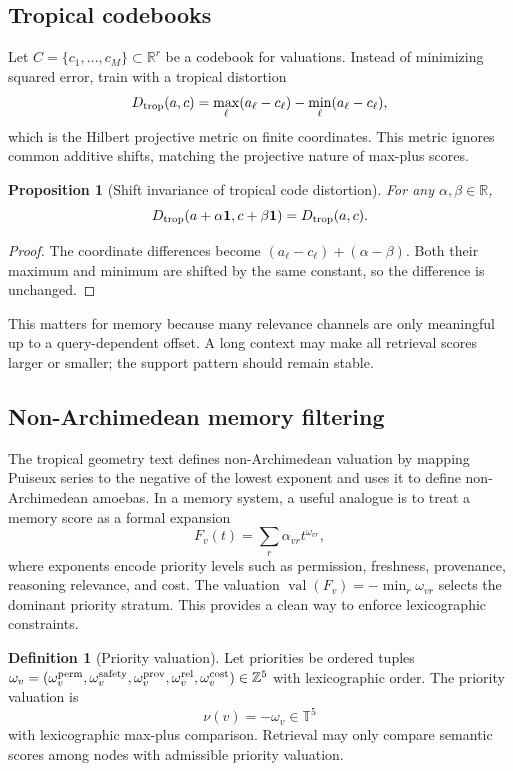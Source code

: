 \documentclass[11pt]{article}
\newtheorem{proposition}[theorem]{Proposition}
\theoremstyle{definition}
\newtheorem{definition}[theorem]{Definition}
\theoremstyle{remark}
\newcommand{\T}{\mathbb{T}}
\newcommand{\R}{\mathbb{R}}
\newcommand{\Z}{\mathbb{Z}}
\newcommand{\val}{\operatorname{val}}
\newcommand{\one}{\mathbf{1}}
\begin{document}
\subsection{Tropical codebooks}

Let \(C=\{c_1,\ldots,c_M\}\subset\R^r\) be a codebook for valuations. Instead of minimizing squared error, train with a tropical distortion
\[
    D_{\rm trop}(a,c)=\max_\ell(a_\ell-c_\ell)-\min_\ell(a_\ell-c_\ell),
\]
which is the Hilbert projective metric on finite coordinates. This metric ignores common additive shifts, matching the projective nature of max-plus scores.

\begin{proposition}[Shift invariance of tropical code distortion]
For any \(\alpha,\beta\in\R\),
\[
    D_{\rm trop}(a+\alpha\one,c+\beta\one)=D_{\rm trop}(a,c).
\]
\end{proposition}
\begin{proof}
The coordinate differences become \((a_\ell-c_\ell)+(\alpha-\beta)\). Both their maximum and minimum are shifted by the same constant, so the difference is unchanged.
\end{proof}

This matters for memory because many relevance channels are only meaningful up to a query-dependent offset. A long context may make all retrieval scores larger or smaller; the support pattern should remain stable.

\subsection{Non-Archimedean memory filtering}

The tropical geometry text defines non-Archimedean valuation by mapping Puiseux series to the negative of the lowest exponent and uses it to define non-Archimedean amoebas. In a memory system, a useful analogue is to treat a memory score as a formal expansion
\[
    F_v(t)=\sum_r \alpha_{vr} t^{\omega_{vr}},
\]
where exponents encode priority levels such as permission, freshness, provenance, reasoning relevance, and cost. The valuation \(\val(F_v)=-\min_r\omega_{vr}\) selects the dominant priority stratum. This provides a clean way to enforce lexicographic constraints.

\begin{definition}[Priority valuation]
Let priorities be ordered tuples \(\omega_v=(\omega^{\rm perm}_v,\omega^{\rm safety}_v,\omega^{\rm prov}_v,\omega^{\rm rel}_v,\omega^{\rm cost}_v)\in\Z^5\) with lexicographic order. The priority valuation is
\[
    \nu(v)= -\omega_v\in\T^5
\]
with lexicographic max-plus comparison. Retrieval may only compare semantic scores among nodes with admissible priority valuation.
\end{definition}
\end{document}
